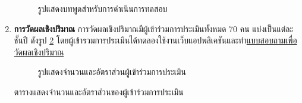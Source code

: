 \begin{enumerate}
\begin{figure}[H]
              \caption{รูปแสดงบทพูดสำหรับการดำเนินการทดสอบ}\label{fig:ScriptUT}
          \end{figure}
    \item \textbf{การวัดผลเชิงปริมาณ} การวัดผลเชิงปริมาณมีผู้เข้าร่วมการประเมินทั้งหมด 70 คน แบ่งเป็นแต่ละชั้นปี ดังรูป \ref{fig:UserRatio}  โดยผู้เข้ารวมการประเมินได้ทดลองใช้งานเว็บแอปพลิเคชันและทำ\href{https://forms.office.com/r/CRHVxtCC4t}{แบบสอบถามเพื่อวัดผลเชิงปริมาณ}
          \begin{figure}[H]\centering
              \caption{รูปแสดงจำนวนและอัตราส่วนผู้เข้าร่วมการประเมิน}\label{fig:UserRatio}
          \end{figure}
          \begin{table}[H]
              \caption{ตารางแสดงจำนวนและอัตราส่วนของผู้เข้าร่วมการประเมิน}

\end{table}
\end{enumerate}
